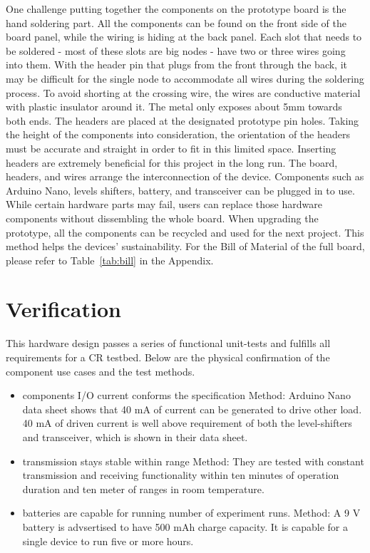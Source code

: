 One challenge putting together the components on the prototype board is the hand soldering part. All the components can be found on the front side of the board panel, while the wiring is hiding at the back panel. Each slot that needs to be soldered - most of these slots are big nodes - have two or three wires going into them. With the header pin that plugs from the front through the back, it may be  difficult for the single node to accommodate all wires during the soldering process. To avoid shorting at the crossing wire, the wires are conductive material with plastic insulator around it. The metal only exposes about 5mm towards both ends. The headers are placed at the designated prototype pin holes. Taking the height of the components into consideration, the orientation of the headers must be accurate and straight in order to fit in this limited space. Inserting headers are extremely beneficial for this project in the long run. The board, headers, and wires arrange the interconnection of the device. Components such as Arduino Nano, levels shifters, battery, and transceiver can be plugged in to use. While certain hardware parts may fail, users can replace those hardware components without dissembling the whole board. When upgrading the prototype, all the components can be recycled and used for the next project. This method helps the devices' sustainability. For the Bill of Material of the full board, please refer to Table~\ref{tab:bill} in the Appendix.


\section{Verification}

This hardware design passes a series of functional unit-tests and fulfills all requirements for a CR testbed. Below are the physical confirmation of the component use cases and the test methods.

\begin{itemize}
  \item components I/O current conforms the specification\newline
  Method: Arduino Nano data sheet shows that 40 mA of current can be generated to drive other load. 40 mA of driven current is well above requirement of both the level-shifters and transceiver, which is shown in their data sheet.
  \item transmission stays stable within range\newline
  Method: They are tested with constant transmission and receiving functionality within ten minutes of operation duration and ten meter of ranges in room temperature.
  \item batteries are capable for running number of experiment runs.\newline
  Method: A 9 V battery is advsertised to have 500 mAh charge capacity. It is capable for a single device to run five or more hours.
\end{itemize}

